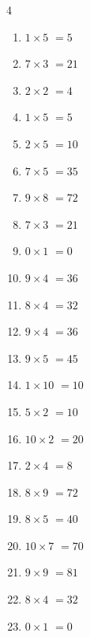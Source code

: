 \begin{multicols}{4}
\begin{enumerate}
  \item $1\times 5$
        $=5$

  \item $7\times 3$
        $=21$

  \item $2\times 2$
        $=4$

  \item $1\times 5$
        $=5$

  \item $2\times 5$
        $=10$

  \item $7\times 5$
        $=35$

  \item $9\times 8$
        $=72$

\columnbreak %

  \item $7\times 3$
        $=21$

  \item $0\times 1$
        $=0$

  \item $9\times 4$
        $=36$

  \item $8\times 4$
        $=32$

  \item $9\times 4$
        $=36$

  \item $9\times 5$
        $=45$

  \item $1\times 10$
        $=10$

  \item $5\times 2$
        $=10$

  \item $10\times 2$
        $=20$

  \item $2\times 4$
        $=8$

  \item $8\times 9$
        $=72$

  \item $8\times 5$
        $=40$

  \item $10\times 7$
        $=70$

  \item $9\times 9$
        $=81$

  \item $8\times 4$
        $=32$

  \item $0\times 1$
        $=0$


\end{enumerate}
\end{multicols}
